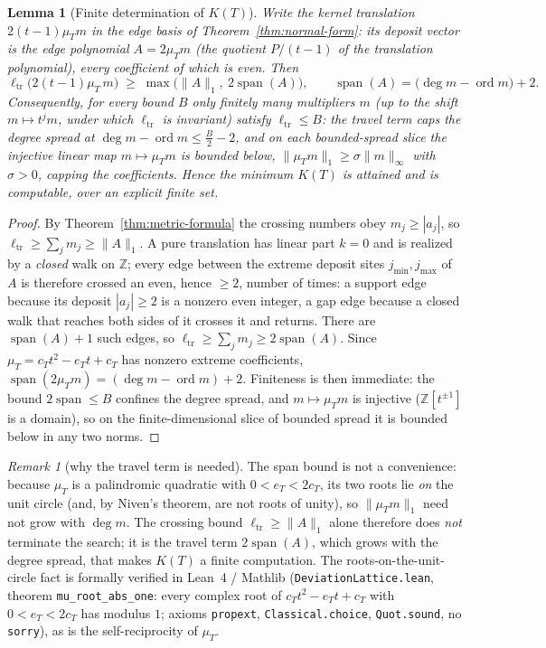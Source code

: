 \documentclass[11pt]{article}
\theoremstyle{plain}
\newtheorem{lemma}[theorem]{Lemma}
\theoremstyle{definition}
\theoremstyle{remark}
\newtheorem{remark}[theorem]{Remark}
\begin{document}
\begin{lemma}[Finite determination of $K(T)$]
\label{lem:finite-svp}
Write the kernel translation $2(t-1)\mu_T m$ in the edge basis of
Theorem~\ref{thm:normal-form}: its deposit vector is the edge polynomial
$A = 2\mu_T m$ (the quotient $P/(t-1)$ of the translation polynomial), every
coefficient of which is even. Then
\[
   \ell_{\mathrm{tr}}\bigl(2(t-1)\mu_T\, m\bigr)\;\ge\;
   \max\bigl(\|A\|_1,\ 2\operatorname{span}(A)\bigr),
   \qquad
   \operatorname{span}(A) = \bigl(\deg m-\operatorname{ord}m\bigr)+2 .
\]
Consequently, for every bound $B$ only finitely many multipliers $m$ (up to the
shift $m\mapsto t^{j}m$, under which $\ell_{\mathrm{tr}}$ is invariant) satisfy
$\ell_{\mathrm{tr}}\le B$: the travel term caps the degree spread at
$\deg m-\operatorname{ord}m\le \tfrac B2-2$, and on each bounded-spread slice the
injective linear map $m\mapsto\mu_T m$ is bounded below, $\|\mu_T m\|_1\ge
\sigma\|m\|_\infty$ with $\sigma>0$, capping the coefficients. Hence the minimum
$K(T)$ is attained and is computable, over an explicit finite set.
\end{lemma}

\begin{proof}
By Theorem~\ref{thm:metric-formula} the crossing numbers obey $m_j\ge|a_j|$, so
$\ell_{\mathrm{tr}}\ge\sum_j m_j\ge\|A\|_1$. A pure translation has linear part
$k=0$ and is realized by a \emph{closed} walk on $\mathbb Z$; every edge between
the extreme deposit sites $j_{\min},j_{\max}$ of $A$ is therefore crossed an even,
hence $\ge2$, number of times: a support edge because its deposit $|a_j|\ge2$
is a nonzero even integer, a gap edge because a closed walk that reaches both
sides of it crosses it and returns. There are $\operatorname{span}(A)+1$ such
edges, so $\ell_{\mathrm{tr}}\ge\sum_j m_j\ge2\operatorname{span}(A)$. Since
$\mu_T=c_Tt^2-e_Tt+c_T$ has nonzero extreme coefficients,
$\operatorname{span}(2\mu_T m)=(\deg m-\operatorname{ord}m)+2$. Finiteness is then
immediate: the bound $2\operatorname{span}\le B$ confines the degree spread, and
$m\mapsto\mu_T m$ is injective ($\mathbb Z[t^{\pm1}]$ is a domain), so on the
finite-dimensional slice of bounded spread it is bounded below in any two norms.
\end{proof}

\begin{remark}[why the travel term is needed]
\label{rem:l1-insufficient}
The span bound is not a convenience: because $\mu_T$ is a palindromic quadratic
with $0<e_T<2c_T$, its two roots lie \emph{on} the unit circle (and, by Niven's
theorem, are not roots of unity), so $\|\mu_T m\|_1$ need not grow with
$\deg m$. The crossing bound $\ell_{\mathrm{tr}}\ge\|A\|_1$ alone therefore does
\emph{not} terminate the search; it is the travel term $2\operatorname{span}(A)$,
which grows with the degree spread, that makes $K(T)$ a finite computation. The
roots-on-the-unit-circle fact is formally verified in Lean~4 / Mathlib
(\texttt{DeviationLattice.lean}, theorem \texttt{mu\_root\_abs\_one}: every
complex root of $c_Tt^2-e_Tt+c_T$ with $0<e_T<2c_T$ has modulus $1$; axioms
\texttt{propext}, \texttt{Classical.choice}, \texttt{Quot.sound}, no
\texttt{sorry}), as is the self-reciprocity of $\mu_T$.
\end{remark}
\end{document}
